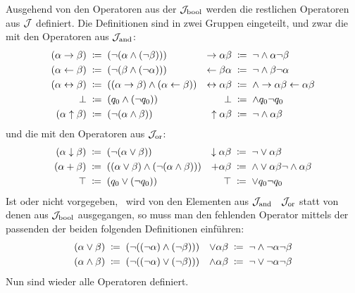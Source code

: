Ausgehend von den Operatoren aus der  $\mathcal{J}_{\mathrm{bool}}$ werden die restlichen Operatoren aus $\mathcal{J}$ definiert. Die Definitionen sind in zwei Gruppen eingeteilt, und zwar die mit den Operatoren aus $\mathcal{J}_{\mathrm{and}}$:
\begin{align}
	(\alpha \rightarrow \beta) &\;\coloneqq\; (\lnot (\alpha \land  (\lnot \beta))) &
	\rightarrow \alpha \beta   &\;\coloneqq\;  \lnot    \land \alpha \lnot \beta
	\label{def:imp}
	\\
	(\alpha \leftarrow \beta) &\;\coloneqq\; (\lnot (\beta \land  (\lnot \alpha))) &
	\leftarrow \beta  \alpha  &\;\coloneqq\;  \lnot    \land \beta \lnot \alpha
	\label{def:rep}
	\\
	(\alpha\leftrightarrow\beta) &\;\coloneqq\;((\alpha\rightarrow\beta)\land(\alpha\leftarrow\beta))&
	\leftrightarrow\alpha \beta  &\;\coloneqq\;\land \rightarrow \alpha \beta \leftarrow \alpha \beta
	\label{def:equiv}
	\\
	\bot              &\;\coloneqq\; (q_0 \land (\lnot q_0)) &
	\bot              &\;\coloneqq\;  \land q_0  \lnot q_0   \label{def:false}
	\\
	(\alpha \uparrow \beta)&\;\coloneqq\; (\lnot (\alpha \land \beta )) &
	\uparrow \alpha  \beta &\;\coloneqq\;  \lnot  \land \alpha \beta \label{def:nand}
\end{align}
und die mit den Operatoren aus $\mathcal{J}_{\mathrm{or}}$:
\begin{align}
	(\alpha \downarrow \beta) &\;\coloneqq\; (\lnot (\alpha \lor \beta))   &
	\downarrow \alpha  \beta  & \;\coloneqq\;  \lnot  \lor \alpha \beta \label{def:nor}
	\\
	(\alpha+\beta)&\;\coloneqq\;((\alpha\lor\beta)\land(\lnot(\alpha\land\beta)))&
	+\alpha \beta &\;\coloneqq\;  \land \lor\alpha\beta \lnot \land\alpha\beta
	\label{def:add}
	\\
	\top & \;\coloneqq\; (q_0 \lor (\lnot q_0)) &
	\top & \;\coloneqq\;  \lor q_0  \lnot q_0
	\label{def:true}
\end{align}
%
Ist \chrqt{$\lor$} oder \chrqt{$\land$} nicht vorgegeben, \textdh\ wird von den Elementen aus $\mathcal{J}_{\mathrm{and}}$ \textbzgl\ $\mathcal{J}_{\mathrm{or}}$ statt von denen aus $\mathcal{J}_{\mathrm{bool}}$ ausgegangen, so muss man den fehlenden Operator mittels der passenden der beiden folgenden Definitionen einführen:
\begin{align}
	(\alpha \lor \beta)  & \;\coloneqq\; (\lnot((\lnot\alpha)\land(\lnot\beta))) &
	\lor \alpha  \beta   & \;\coloneqq\;  \lnot \land \lnot \alpha \lnot \beta
	\label{def:orand} \\
	(\alpha \land \beta) & \;\coloneqq\; (\lnot((\lnot\alpha)\lor(\lnot\beta)))  &
	\land \alpha  \beta  & \;\coloneqq\;  \lnot \lor \lnot \alpha \lnot \beta
	\label{def:andor}
\end{align}
Nun sind wieder alle Operatoren definiert.

